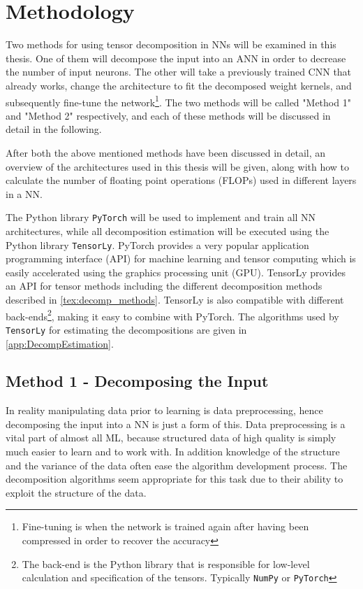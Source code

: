 \section{Methodology} \label{tex:methodology}
Two methods for using tensor decomposition in NNs will be examined in this thesis. One of them will decompose the input into an ANN in order to decrease the number of input neurons. The other will take a previously trained CNN that already works, change the architecture to fit the decomposed weight kernels, and subsequently fine-tune the network\footnote{Fine-tuning is when the network is trained again after having been compressed in order to recover the accuracy}. The two methods will be called "Method 1" and "Method 2" respectively, and each of these methods will be discussed in detail in the following. 

After both the above mentioned methods have been discussed in detail, an overview of the architectures used in this thesis will be given, along with how to calculate the number of floating point operations (FLOPs) used in different layers in a NN.

The Python library \texttt{PyTorch}\cite{pytorch} will be used to implement and train all NN architectures, while all decomposition estimation will be executed using the Python library \texttt{TensorLy}\cite{tensorly}. PyTorch provides a very popular application programming interface (API) for machine learning and tensor computing which is easily accelerated using the graphics processing unit (GPU). TensorLy provides an API for tensor methods including the different decomposition methods described in \autoref{tex:decomp_methods}. TensorLy is also compatible with different back-ends\footnote{The back-end is the Python library that is responsible for low-level calculation and specification of the tensors. Typically \texttt{NumPy}\cite{numpy} or \texttt{PyTorch}\cite{pytorch}}, making it easy to combine with PyTorch. The algorithms used by \texttt{TensorLy} for estimating the decompositions are given in \autoref{app:DecompEstimation}.

\subsection{Method 1 - Decomposing the Input}
In reality manipulating data prior to learning is data preprocessing, hence decomposing the input into a NN is just a form of this. Data preprocessing is a vital part of almost all ML, because structured data of high quality is simply much easier to learn and to work with. 
In addition knowledge of the structure and the variance of the data often ease the algorithm development process. The decomposition algorithms seem appropriate for this task due to their ability to exploit the structure of the data.


